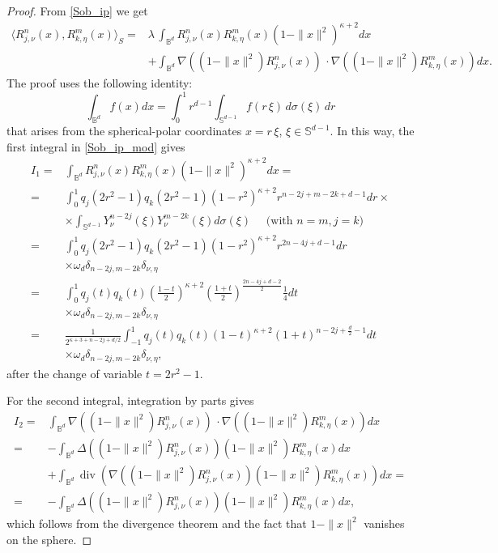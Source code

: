 \documentclass[10pt,a4paper]{amsart}
\def\dive{\operatorname{div}}
\begin{document}
\begin{proof}
From \eqref{Sob_ip} we get
\begin{align}
\langle R_{j,\nu}^{n}(x),R_{k,\eta}^{m}(x)\rangle_{S} =& \lambda\, \int_{\mathbb{B}^d} R_{j,\nu}^{n}(x) R_{k,\eta}^{m}(x) (1-\|x\|^2)^{\kappa + 2} dx \nonumber \\
   &+ \int_{\mathbb{B}^d} \nabla ((1-\|x\|^2)R_{j,\nu}^{n}(x))\,\cdot \nabla ((1-\|x\|^2)R_{k,\eta}^{m}(x)) dx. \label{Sob_ip_mod}
\end{align}
The proof uses the following identity: 
\begin{equation}\label{changevar}
        \int_{\mathbb{B}^d} f(x) dx = \int_0^1 r^{d-1}\int_{\mathbb{S}^{d-1}}f(r\,\xi)\, d\sigma (\xi)\,dr
\end{equation}
that arises from the spherical-polar coordinates $x=r\,\xi$, $\xi\in \mathbb{S}^{d-1}$. In this way, the first integral in \eqref{Sob_ip_mod} gives
\begin{align*}
I_1 =& \int_{\mathbb{B}^d} R_{j,\nu}^{n}(x) R_{k,\eta}^{m}(x) (1-\|x\|^2)^{\kappa+2} dx =\\
   =& \int_{0}^1 q_{j}(2 r^2 -1) q_{k}(2 r^2 -1) (1-r^2)^{\kappa + 2} r^{n-2j+m-2k+d-1} dr \times \\
   &\times \int_{\mathbb{S}^{d-1}}  Y_\nu^{n-2j}(\xi) Y_\nu^{m-2k}(\xi) d\sigma(\xi) \quad \text{ (with } n = m, j = k) \\
=& \int_{0}^1 q_{j}(2 r^2 -1) q_{k}(2 r^2 -1) (1-r^2)^{\kappa + 2} r^{2n-4j+d-1} dr\\ 
& \times \omega_d \delta_{n-2j,m-2k} \delta_{\nu,\eta} \\
=& \int_{0}^1 q_{j}(t) q_{k}(t) \left(\frac{1-t}{2}\right)^{\kappa + 2} \left(\frac{1+t}{2}\right)^{\frac{2n-4j+d-2}{2}}\frac{1}{4} dt\\ 
& \times \omega_d \delta_{n-2j,m-2k} \delta_{\nu,\eta} \\
=& \frac{1}{2^{\kappa+3+n-2j+d/2}} \int_{-1}^1 q_{j}(t) q_{k}(t) (1-t)^{\kappa + 2} (1+t)^{n-2j+\frac{d}{2}-1} dt\\
&\times \omega_d\delta_{n-2j,m-2k} \delta_{\nu,\eta},
\end{align*}
after the change of variable \(t = 2r^2 - 1\).

For the second integral, integration by parts gives
\begin{align*}
I_2 =& \int_{\mathbb{B}^d} \nabla ((1-\|x\|^2)R_{j,\nu}^{n}(x))\,\cdot \nabla ((1-\|x\|^2)R_{k,\eta}^{m}(x)) dx \\
=& - \int_{\mathbb{B}^d} \Delta ((1-\|x\|^2)R_{j,\nu}^{n}(x))(1-\|x\|^2)R_{k,\eta}^{m}(x) dx \\
& + \int_{\mathbb{B}^d} \dive \left(\nabla((1-\|x\|^2)R_{j,\nu}^{n}(x))(1-\|x\|^2)R_{k,\eta}^{m}(x)\right) dx =\\
=& - \int_{\mathbb{B}^d} \Delta ((1-\|x\|^2)R_{j,\nu}^{n}(x))(1-\|x\|^2)R_{k,\eta}^{m}(x) dx,
\end{align*}
which follows from the divergence theorem and the fact that \(1-\|x\|^2\) vanishes on the sphere.


\end{proof}
\end{document}
